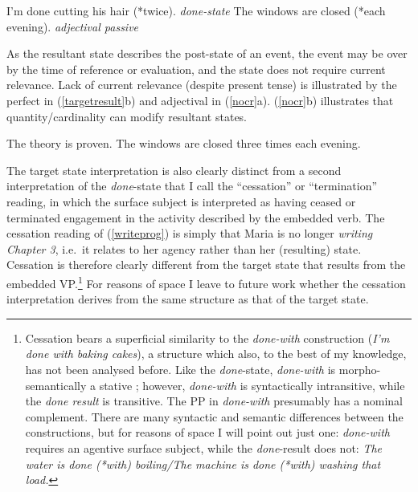 \documentclass[output=paper]{langsci/langscibook}
\begin{document}
\begin{exe}
\ex\label{resst}
\begin{xlist}
\ex I'm done cutting his hair (*twice).  \hfill \emph{done-state}
\ex The windows are closed (*each evening). \hfill \emph{adjectival passive}
\end{xlist}
\end{exe}

As the resultant state describes the post-state of an event, the event may be over by the time of reference or evaluation, and the state does not require current relevance. Lack of current relevance (despite present tense) is illustrated by the perfect in (\ref{targetresult}b) and adjectival  in (\ref{nocr}a). (\ref{nocr}b) illustrates that quantity/cardinality  can modify resultant states.

\begin{exe}
\ex\label{nocr}
\begin{xlist}
\ex The theory is proven.
\ex The windows are closed three times each evening.
\end{xlist}
\end{exe}

The target state interpretation is also clearly distinct from a second
interpretation of the \emph{done}-state that I call the \enquote{cessation} or
\enquote{termination} reading, in which the surface subject is interpreted as
having ceased or terminated engagement in the activity described by the
embedded verb. The cessation reading of (\ref{writeprog}) is simply that Maria
is no longer \emph{writing Chapter 3}, i.e.\ it relates to her agency rather
than her (resulting) state. Cessation is therefore clearly different from the
target state that results from the embedded VP\@.\footnote{Cessation bears a
    superficial similarity to the {\em done-with} construction (\emph{I'm
    done with baking cakes}), a structure which also, to the best of my
    knowledge, has not been analysed before. Like the \emph{done}-state, {\em
    done-with} is morpho-semantically a stative ; however, {\em
done-with} is syntactically intransitive, while the \emph{done result} is
transitive. The PP in {\em done-with} presumably has a nominal complement.
There are many syntactic and semantic differences between the constructions,
but for reasons of space I will point out just one: {\em done-with} requires an
agentive surface subject, while the {\em done}-result does not: \emph{The water
is done (*with) boiling\slash The machine is done (*with) washing that load.}} For
reasons of space I leave to future work whether the cessation interpretation
derives from the same structure as that of the target state.
\end{document}
